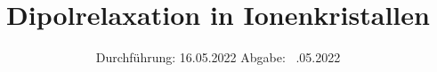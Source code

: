 

\subject{Versuch Nr.V48}
\title{Dipolrelaxation in Ionenkristallen}
\date{%
  Durchführung: 16.05.2022
  \hspace{3em}
  Abgabe: ~.05.2022
}



\maketitle
\thispagestyle{empty}
\tableofcontents
\newpage 






%

\nocite{*}

\printbibliography{}


